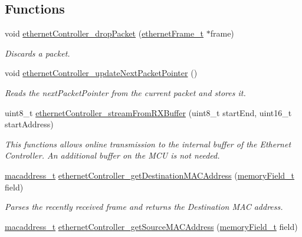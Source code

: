 \subsection*{Functions}
\begin{DoxyCompactItemize}
\item 
void \mbox{\hyperlink{group__data__reception_gada8fcdc667d1800b5f963bfc8cea56c2}{ethernet\+Controller\+\_\+drop\+Packet}} (\mbox{\hyperlink{group__ethernet_ga7519a7ae14b490659069435698d28a25}{ethernet\+Frame\+\_\+t}} $\ast$frame)
\begin{DoxyCompactList}\small\item\em Discards a packet. \end{DoxyCompactList}\item 
void \mbox{\hyperlink{group__data__reception_ga9d6d9257b64641f2120cb99f31d66a0e}{ethernet\+Controller\+\_\+update\+Next\+Packet\+Pointer}} ()
\begin{DoxyCompactList}\small\item\em Reads the next\+Packet\+Pointer from the current packet and stores it. \end{DoxyCompactList}\item 
uint8\+\_\+t \mbox{\hyperlink{group__data__reception_ga152b0e0b0d3ed72affb7feac14035b6e}{ethernet\+Controller\+\_\+stream\+From\+R\+X\+Buffer}} (uint8\+\_\+t start\+End, uint16\+\_\+t start\+Address)
\begin{DoxyCompactList}\small\item\em This functions allows online transmission to the internal buffer of the Ethernet Controller. An additional buffer on the M\+CU is not needed. \end{DoxyCompactList}\item 
\mbox{\hyperlink{group__ethernet_gacb865bcbf50a6c8cef05581bfabff373}{macaddress\+\_\+t}} \mbox{\hyperlink{group__data__reception_ga29e5c29891e62206ceed99a6b15749a0}{ethernet\+Controller\+\_\+get\+Destination\+M\+A\+C\+Address}} (\mbox{\hyperlink{group__memory_ga1d04d80fae40964f55d2df46b5d64785}{memory\+Field\+\_\+t}} field)
\begin{DoxyCompactList}\small\item\em Parses the recently received frame and returns the Destination M\+AC address. \end{DoxyCompactList}\item 
\mbox{\hyperlink{group__ethernet_gacb865bcbf50a6c8cef05581bfabff373}{macaddress\+\_\+t}} \mbox{\hyperlink{group__data__reception_gabe0967f5f15ce26c4bb723036e566afe}{ethernet\+Controller\+\_\+get\+Source\+M\+A\+C\+Address}} (\mbox{\hyperlink{group__memory_ga1d04d80fae40964f55d2df46b5d64785}{memory\+Field\+\_\+t}} field)

\end{DoxyCompactItemize}

